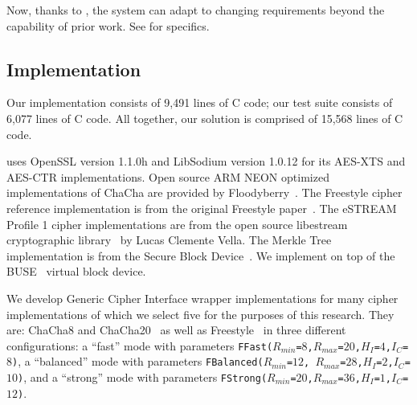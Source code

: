 Now, thanks to \sys, the system can adapt to changing requirements beyond
the capability of prior work. See  for specifics.

\subsection{\sys Implementation} \label{subsec:implementation}

Our \sys implementation consists of 9,491 lines of C code; our test suite
consists of 6,077 lines of C code. All together, our solution is comprised of
15,568 lines of C code.

\sys uses OpenSSL version 1.1.0h and LibSodium version 1.0.12 for its
AES-XTS and AES-CTR implementations. Open source ARM NEON optimized
implementations of ChaCha are provided by Floodyberry~\cite{Floodyberry}. The
Freestyle cipher reference implementation is from the original Freestyle
paper~\cite{Freestyle}. The eSTREAM Profile 1 cipher implementations are from
the open source libestream cryptographic library~\cite{libestream} by Lucas
Clemente Vella. The Merkle Tree implementation is from the Secure Block
Device~\cite{SBD}. We implement \sys on top of the BUSE~\cite{BUSE}
virtual block device.

We develop Generic Cipher Interface wrapper implementations for many
cipher implementations of which we select five for the purposes of
this research. They are: ChaCha8 and ChaCha20~\cite{ChaCha20} as well
as Freestyle~\cite{Freestyle} in three different configurations: a
``fast'' mode with parameters
\texttt{FFast($R_{min}$=$8$,$R_{max}$=$20$,$H_I$=$4$,$I_C$=$8$)}, a
``balanced'' mode with parameters \texttt{FBalanced($R_{min}$=$12$,
  $R_{max}$=$28$,$H_I$=$2$,$I_C$=$10$)}, and a ``strong'' mode with
parameters
\texttt{FStrong($R_{min}$=$20$,$R_{max}$=$36$,$H_I$=$1$,$I_C$=$12$)}.
